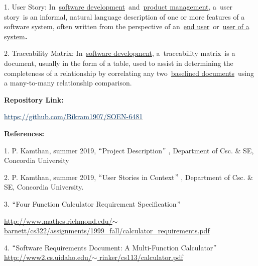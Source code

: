 \documentclass[12pt]{article}
\begin{document}
\setlength{\parskip}{6.0pt}
1. User Story:\textbf{ }In \href{https://en.wikipedia.org/wiki/Software_development}{software development} and \href{https://en.wikipedia.org/wiki/Product_management}{product management}, a user story is an informal, natural language description of one or more features of a software system, often written from the perspective of an \href{https://en.wikipedia.org/wiki/User_(computing)}{end user} or \href{https://en.wikipedia.org/wiki/User_(system)}{user of a system}\textbf{.}\par

\setlength{\parskip}{2.04pt}
2. Traceability Matrix: In \href{https://en.wikipedia.org/wiki/Software_development}{software development}, a traceability matrix is a document, usually in the form of a table, used to assist in determining the completeness of a relationship by correlating any two \href{https://en.wikipedia.org/wiki/Baseline_(configuration_management)}{baselined documents} using a many-to-many relationship comparison.\par


\vspace{\baselineskip}
{\fontsize{13pt}{15.6pt}\selectfont \textbf{Repository Link: }\par}\par


\vspace{\baselineskip}
\href{https://github.com/Bikram1907/SOEN-6481}{\textcolor[HTML]{023160}{https://github.com/Bikram1907/SOEN-6481}}\par


\vspace{\baselineskip}
{\fontsize{13pt}{15.6pt}\selectfont \textbf{References: }\par}\par

1. P. Kamthan, summer 2019, $``$Project Description$"$ , Department of Csc. $\&$  SE, Concordia University\par

2. P. Kamthan, summer 2019, $``$User Stories in Context$"$ , Department of Csc. $\&$  SE, Concordia University.\par

3. $``$Four Function Calculator Requirement Specification$"$ \par

\href{http://www.mathcs.richmond.edu/~barnett/cs322/assignments/1999_fall/calculator_requirements.pdf}{http://www.mathcs.richmond.edu/$ \sim $ barnett/cs322/assignments/1999\_fall/calculator\_requirements.pdf}\par

4. $``$Software Requirements Document: A Multi-Function Calculator$"$  \href{http://www2.cs.uidaho.edu/~rinker/cs113/calculator.pdf}{http://www2.cs.uidaho.edu/$ \sim $ rinker/cs113/calculator.pdf}\par


\vspace{\baselineskip}

\vspace{\baselineskip}

\printbibliography
\end{document}
